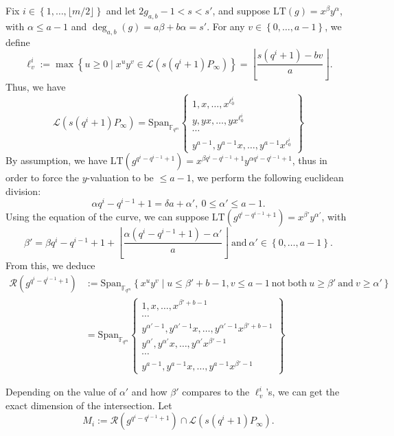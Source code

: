 \documentclass[a4paper]{article}
\theoremstyle{definition}
\theoremstyle{remark}
\newcommand{\calL}{\mathcal{L}}
\newcommand{\calR}{\mathcal{R}}
\newcommand{\fqm}{\mathbb{F}_{q^m}}
\newcommand{\set}[1]{\left\{#1\right\}}
\newcommand{\degab}[1]{\deg_{a,b}\left(#1\right)}
\begin{document}
Fix $i \in \set{1,\dots,\lfloor m/2 \rfloor}$ and let $2g_{a,b}-1 < s <s'$, and suppose $\mathrm{LT}(g)=x^{\beta}y^{\alpha}$, with $\alpha \leq a-1$ and $\degab{g}=a\beta +b\alpha=s'$. For any $v \in \set{0,\dots,a-1}$, we define
$$\ell^i_v := \max \set{u \geq 0 \mid x^uy^v \in \calL(s(q^i+1)P_\infty)} = \left\lfloor \dfrac{s(q^i+1)-bv}{a}\right\rfloor.$$
Thus, we have
\begin{equation*}
\calL(s(q^i+1)P_\infty) = \mathrm{Span}_{\fqm}    \left\{ \begin{array}{cc}
         1,x,\dots,x^{\ell^i_0}   \\
         y,yx,\dots,yx^{\ell^i_0} \\
         \cdots \\
         y^{a-1},y^{a-1}x,\dots,y^{a-1}x^{\ell^i_0}
    \end{array}
    \right\}
\end{equation*}
By assumption, we have $\mathrm{LT}(g^{q^i-q^{i-1}+1})=x^{\beta q^i-q^{i-1}+1}y^{\alpha q^i-q^{i-1}+1}$, thus in order to force the $y$-valuation to be $\leq a-1$, we perform the following euclidean division:
$$\alpha q^i-q^{i-1}+1 = \delta a + \alpha', \ 0 \leq \alpha' \leq a-1.$$
Using the equation of the curve, we can suppose  $\mathrm{LT}(g^{q^i-q^{i-1}+1})=x^{\beta'}y^{\alpha '}$, with 
$$\beta' = \beta q^i-q^{i-1}+1 + \left\lfloor \frac{\alpha (q^i-q^{i-1}+1)-\alpha'}{a} \right\rfloor \ \mathrm{and} \ \alpha' \in \set{0,\dots,a-1}.$$
From this, we deduce
\begin{align*}
\calR\left(g^{q^i-q^{i-1}+1}\right) &:= \mathrm{Span}_{\fqm} \left\{x^uy^v \mid u \leq \beta'+b-1 , v \leq a-1 \ \mathrm{not \ both} \ u \geq \beta' \ \mathrm{and} \ v \geq \alpha'\right\} \\
&= \mathrm{Span}_{\fqm}    \left\{ \begin{array}{cc}
         1,x,\dots,x^{\beta' +b-1}   \\
         \cdots \\
         y^{\alpha' -1},y^{\alpha' -1}x,\dots,y^{\alpha' -1}x^{\beta' +b-1} \\
          y^{\alpha'},y^{\alpha'}x,\dots,y^{\alpha'}x^{\beta'-1} \\
         \cdots \\
         y^{a-1},y^{a-1}x,\dots,y^{a-1}x^{\beta'-1}
    \end{array}
    \right\}
\end{align*}

Depending on the value of $\alpha'$ and how $\beta'$ compares to the $\ell^i_v$'s, we can get the exact dimension of the intersection. Let
$$M_i := \calR\left(g^{q^i-q^{i-1}+1}\right) \cap \calL(s(q^i+1)P_\infty).$$
\end{document}

